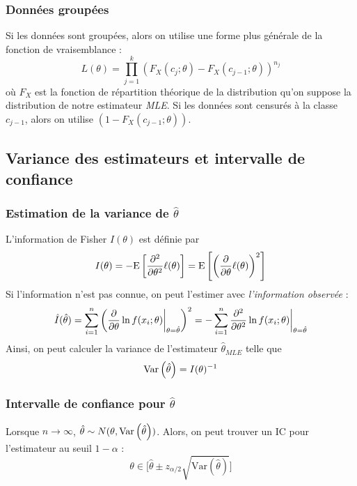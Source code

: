 \documentclass[french, landscape]{article}
\begin{document}
\begin{multicols*}{3}
\subsubsection*{Données groupées}
Si les données sont groupées, alors on utilise une forme plus générale de la fonction de vraisemblance : 
\[L(\theta) =  \prod_{j=1}^{k}  \left( F_X(c_{j} ; \theta) - F_X(c_{j-1} ; \theta) \right)^{n_j}   \]
où $F_X$ est la fonction de répartition théorique de la distribution qu'on suppose la distribution de notre estimateur \emph{MLE}. Si les données sont censurés à la classe $c_{j-1}$, alors on utilise $(1-F_X(c_{j-1}; \theta))$.

\subsection*{Variance des estimateurs et intervalle de confiance}



\subsubsection*{Estimation de la variance de $\hat{\theta}$}
L'information de Fisher $I(\theta)$ est définie par
\[I(\theta) = -\mathrm{E} \left[ \frac{\partial^2}{\partial \theta^2} \ell(\theta) \right] = \mathrm{E} \left[ \left( \frac{\partial}{\partial \theta} \ell(\theta) \right)^2 \right]\]
Si l'information n'est pas connue, on peut l'estimer avec \emph{l'information observée} : 
\[\hat{I}(\hat{\theta}) = \sum_{i=1}^{n} \left( \frac{\partial}{\partial \theta} \ln f(x_i ; \theta) \biggr \rvert_{\theta = \hat{\theta}} \right)^2 = - \sum_{i=1}^{n}  \frac{\partial^2}{\partial \theta^2} \ln f(x_i ; \theta) \biggr \rvert_{\theta = \hat{\theta}}\]
Ainsi, on peut calculer la variance de l'estimateur $\hat{\theta}_{MLE}$ telle que
\[\mathrm{Var} \left( \hat{\theta} \right) = I(\theta)^{-1}\]

\subsubsection*{Intervalle de confiance pour $\hat{\theta}$}
Lorsque $n \to \infty$, $\hat{\theta} \sim N(\theta,	\mathrm{Var} \left( \hat{\theta} \right))$. Alors, on peut trouver un IC pour l'estimateur au seuil $1 - \alpha$ : 
\[\theta \in \Big [   \hat{\theta} \pm z_{\alpha/2} \sqrt{\mathrm{Var}(\hat{\theta})} \Big ]\]



\end{multicols*}
\end{document}

